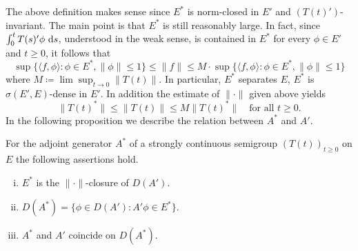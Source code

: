 The above definition makes sense since $E^{*}$ is norm-closed in $E'$ and $(T(t)')$-invariant.
The main point is that $E^{*}$ is still reasonably large.
In fact, since $\int_{0}^{t} T(s)'\phi \,\mathop{}\!\mathrm{d}{s}$, understood in the weak sense, is contained in $E^{*}$ for every $\phi \in E'$ and $t \geq 0$, it follows that
\[
    \sup\{\langle f,\phi \rangle \colon \phi \in E^{*}, \|\phi\| \leq 1\} \leq \|f\| \leq M\cdot\sup\{\langle f,\phi \rangle \colon \phi \in E^{*}, \|\phi\| \leq1\}
\]
where $M \coloneqq \lim\sup_{t \to 0} \|T(t)\|$.
In particular, $E^{*}$ separates $E$, \ie $E^{*}$ is $\sigma(E',E)$-dense in $E'$.
In addition the estimate of $\|\cdot\|$ given above yields
\[
    \|T(t)^{*}\| \leq \|T(t)\| \leq M\|T(t)^{*}\| \quad \text{for all } t \geq 0.
\]
In the following proposition we describe the relation between $A^{*}$ and $A'$.
\begin{proposition}\label{prop:a1-3.4}
For the adjoint generator $A^{*}$ of a strongly continuous semigroup $(T(t))_{t \geq 0}$ on $E$ the following assertions hold.
\begin{enumerate}[(i)]
\item 
$E^{*}$ is the $\|\cdot\|$-closure of $D(A')$.

\item 
$D(A^{*}) = \{\phi \in D(A') \colon A'\phi \in E^{*}\}$.

\item 
$A^{*}$ and $A'$ coincide on $D(A^{*})$.
\end{enumerate}
\end{proposition}
